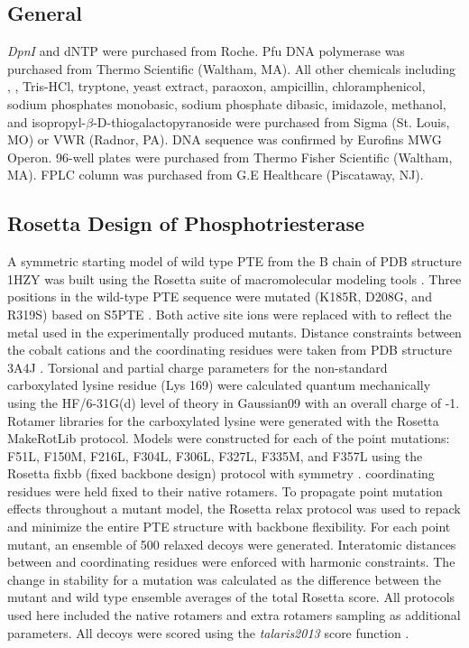 \begin{refsection}
\subsection{General}

\emph{DpnI} and dNTP were purchased from Roche. Pfu DNA polymerase was
purchased from Thermo Scientific (Waltham, MA). All other chemicals including
, , Tris-HCl, tryptone, yeast extract, paraoxon, ampicillin,
chloramphenicol, sodium phosphates monobasic, sodium phosphate dibasic,
imidazole, methanol, and  isopropyl-$\beta$-D-thiogalactopyranoside were
purchased from Sigma (St. Louis, MO) or VWR (Radnor, PA). DNA sequence was
confirmed by Eurofins MWG Operon.  96-well plates were purchased from Thermo
Fisher Scientific (Waltham, MA). FPLC column was purchased from G.E Healthcare
(Piscataway, NJ). 

\subsection{Rosetta Design of Phosphotriesterase}

A symmetric starting model of wild type PTE from the B chain of PDB structure
1HZY \cite{Benning2001a} was built using the Rosetta suite of macromolecular
modeling tools \cite{Leaver-Fay2011,Leaver-Fay2013a,Song2011,Shapovalov2011}.
Three positions in the wild-type PTE sequence were mutated (K185R, D208G, and
R319S) based on S5PTE \cite{Roodveldt2005}. Both active site  ions
were replaced with  to reflect the metal used in the experimentally
produced mutants.  Distance constraints between the cobalt cations and the
coordinating residues were taken from PDB structure 3A4J \cite{Jackson2009b}.
Torsional and partial charge parameters for the non-standard carboxylated
lysine residue (Lys 169) were calculated quantum mechanically using the
HF/6-31G(d) level of theory in Gaussian09 \cite{Frisch2009a} with an overall
charge of -1.  Rotamer libraries for the carboxylated lysine were generated
with the Rosetta MakeRotLib \cite{Renfrew2012b} protocol.  Models were
constructed for each of the point mutations: F51L, F150M, F216L, F304L, F306L,
F327L, F335M, and F357L using the Rosetta fixbb (fixed backbone design)
protocol with symmetry \cite{DiMaio2011a}.  coordinating residues
were held fixed to their native rotamers. To propagate point mutation effects
throughout a mutant model, the Rosetta relax protocol was used to repack and
minimize the entire PTE structure with backbone flexibility. For each point
mutant, an ensemble of 500 relaxed decoys were generated. Interatomic distances
between  and coordinating residues were enforced with harmonic
constraints.  The change in stability for a mutation was calculated as the
difference between the mutant and wild type ensemble averages of the total
Rosetta score. All protocols used here included the native rotamers and extra
rotamers sampling as additional parameters. All decoys were scored using the
\emph{talaris2013} score function \cite{Leaver-Fay2013a}.


\end{refsection}
